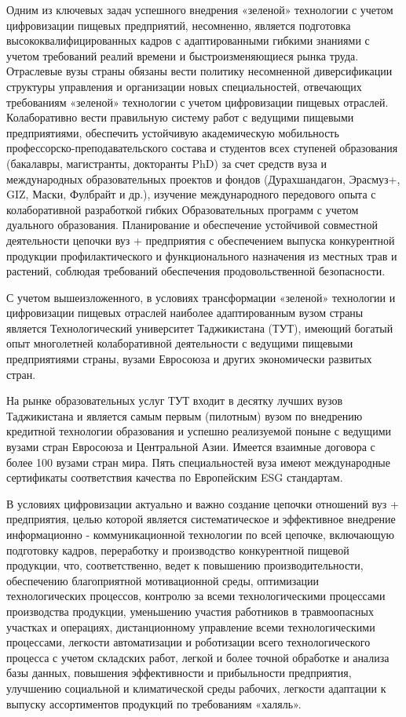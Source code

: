 Одним из ключевых задач успешного внедрения «зеленой» технологии с
учетом цифровизации пищевых предприятий, несомненно, является подготовка
высококвалифицированных кадров с адаптированными гибкими знаниями с
учетом требований реалий времени и быстроизменяющиеся рынка труда.
Отраслевые вузы страны обязаны вести политику несомненной диверсификации
структуры управления и организации новых специальностей, отвечающих
требованиям «зеленой» технологии с учетом цифровизации пищевых отраслей.
Колаборативно вести правильную систему работ с ведущими пищевыми
предприятиями, обеспечить устойчивую академическую мобильность
профессорско-преподавательского состава и студентов всех ступеней
образования (бакалавры, магистранты, докторанты PhD) за счет средств
вуза и международных образовательных проектов и фондов (Дурахшандагон,
Эрасмуз+, GIZ, Маски, Фулбрайт и др.), изучение международного
передового опыта с колаборативной разработкой гибких Образовательных
программ с учетом дуального образования. Планирование и обеспечение
устойчивой совместной деятельности цепочки вуз + предприятия с
обеспечением выпуска конкурентной продукции профилактического и
функционального назначения из местных трав и растений, соблюдая
требований обеспечения продовольственной безопасности.

С учетом вышеизложенного, в условиях трансформации «зеленой» технологии
и цифровизации пищевых отраслей наиболее адаптированным вузом страны
является Технологический университет Таджикистана (ТУТ), имеющий богатый
опыт многолетней колаборативной деятельности с ведущими пищевыми
предприятиями страны, вузами Евросоюза и других экономически развитых
стран.

На рынке образовательных услуг ТУТ входит в десятку лучших вузов
Таджикистана и является самым первым (пилотным) вузом по внедрению
кредитной технологии образования и успешно реализуемой поныне с ведущими
вузами стран Евросоюза и Центральной Азии. Имеется взаимные договора с
более 100 вузами стран мира. Пять специальностей вуза имеют
международные сертификаты соответствия качества по Европейским ESG
стандартам.

В условиях цифровизации актуально и важно создание цепочки отношений вуз
+ предприятия, целью которой является систематическое и эффективное
внедрение информационно - коммуникационной технологии по всей цепочке,
включающую подготовку кадров, переработку и производство конкурентной
пищевой продукции, что, соответственно, ведет к повышению
производительности, обеспечению благоприятной мотивационной среды,
оптимизации технологических процессов, контролю за всеми
технологическими процессами производства продукции, уменьшению участия
работников в травмоопасных участках и операциях, дистанционному
управление всеми технологическими процессами, легкости автоматизации и
роботизации всего технологического процесса с учетом складских работ,
легкой и более точной обработке и анализа базы данных, повышения
эффективности и прибыльности предприятия, улучшению социальной и
климатической среды рабочих, легкости адаптации к выпуску ассортиментов
продукций по требованиям «халяль».

